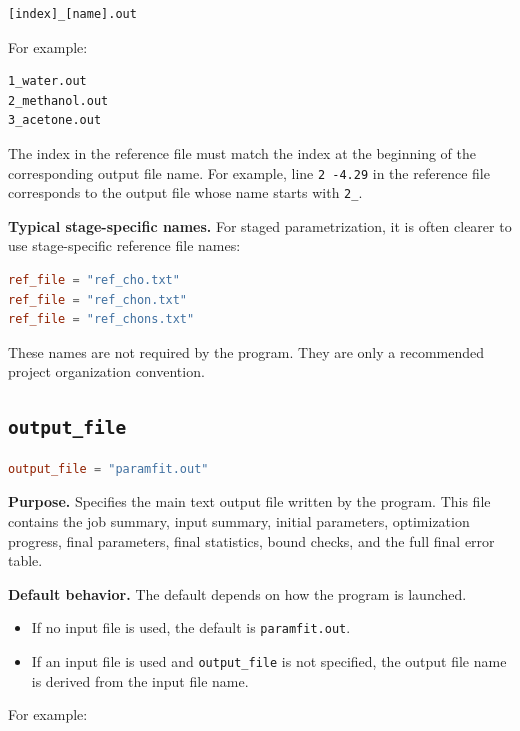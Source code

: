 \documentclass[11pt]{article}
\begin{document}
\begin{lstlisting}
[index]_[name].out
\end{lstlisting}

For example:

\begin{lstlisting}
1_water.out
2_methanol.out
3_acetone.out
\end{lstlisting}

The index in the reference file must match the index at the beginning of the
corresponding output file name. For example, line \texttt{2 -4.29} in the
reference file corresponds to the output file whose name starts with
\texttt{2\_}.

\textbf{Typical stage-specific names.}
For staged parametrization, it is often clearer to use stage-specific reference
file names:

\begin{lstlisting}[language=toml]
ref_file = "ref_cho.txt"
ref_file = "ref_chon.txt"
ref_file = "ref_chons.txt"
\end{lstlisting}

These names are not required by the program. They are only a recommended
project organization convention.

\subsection{\texttt{output\_file}}

\begin{lstlisting}[language=toml]
output_file = "paramfit.out"
\end{lstlisting}

\textbf{Purpose.}
Specifies the main text output file written by the program. This file contains
the job summary, input summary, initial parameters, optimization progress, final
parameters, final statistics, bound checks, and the full final error table.

\textbf{Default behavior.}
The default depends on how the program is launched.

\begin{itemize}[leftmargin=*]
  \item If no input file is used, the default is \texttt{paramfit.out}.
  \item If an input file is used and \texttt{output\_file} is not specified,
        the output file name is derived from the input file name.
\end{itemize}

For example:
\end{document}
